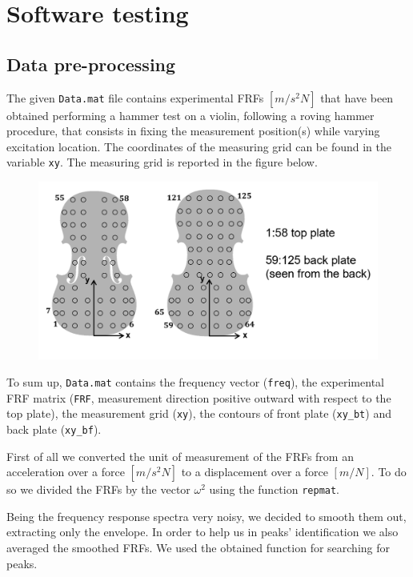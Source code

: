 \documentclass[a4paper,12pt,oneside]{article}
\begin{document}
\section{Software testing}
\subsection{Data pre-processing}

The given \lstinline!Data.mat! file contains experimental FRFs $ [m / s^2 N] $ that have been obtained performing a hammer test on a violin, following a roving hammer procedure, that consists in fixing the measurement position(s) while varying excitation location.
The coordinates of the measuring grid can be found in the variable \lstinline!xy!. The measuring grid is reported in the figure below.

\begin{figure}[H]
	\centering
	\includegraphics[scale=0.4]{grid_slides}
\end{figure}

To sum up, \lstinline!Data.mat! contains the frequency vector (\lstinline!freq!), the experimental FRF matrix (\lstinline!FRF!, measurement direction positive outward with respect to the top plate), the measurement grid (\lstinline!xy!), the contours of front plate (\lstinline!xy_bt!) and back plate (\lstinline!xy_bf!).

First of all we converted the unit of measurement of the FRFs from an acceleration over a force $ [m / s^2 N] $ to a displacement over a force $ [m / N] $. To do so we divided the FRFs by the vector $ \omega^2 $ using the function \lstinline!repmat!.

Being the frequency response spectra very noisy, we decided to smooth them out, extracting only the envelope.
In order to help us in peaks' identification we also averaged the smoothed FRFs. We used the obtained function for searching for peaks.
\end{document}
